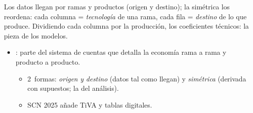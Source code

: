 \documentclass{article}
\begin{document}
\begin{columnas}
\begin{ideaclave}
Los datos llegan por ramas y productos (origen y destino); la simétrica los reordena: cada columna = \emph{tecnología} de una rama, cada fila = \emph{destino} de lo que produce. Dividiendo cada columna por la producción, los coeficientes técnicos: la pieza de los modelos.
\end{ideaclave}
\begin{itemize}
\item {}: parte del sistema de cuentas que detalla la economía rama a rama y producto a producto.
  \begin{itemize}
  \item 2~formas: \emph{origen y destino} (datos tal como llegan) y \emph{simétrica} (derivada con supuestos; la del análisis).
  \item SCN 2025 añade TiVA y tablas digitales.
  \end{itemize}
\end{itemize}


\end{columnas}
\end{document}
